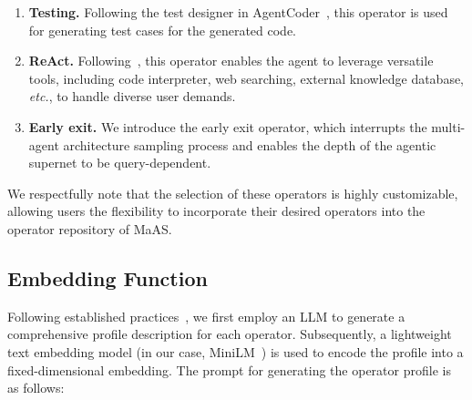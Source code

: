 \documentclass{article}
\theoremstyle{plain}
\theoremstyle{definition}
\theoremstyle{remark}
\newcommand{\ourmethod}{{{MaAS}}\xspace}
\begin{document}
\begin{enumerate}
    \item \textbf{Testing.} Following the test designer in AgentCoder~\cite{huang2023agentcoder}, this operator is used for generating test cases for the generated code.

    \item \textbf{ReAct.} Following~\citep{yao2023react}, this operator enables the agent to leverage versatile tools, including code interpreter, web searching, external knowledge database, \textit{etc.}, to handle diverse user demands. 

    \item \textbf{Early exit.} We introduce the early exit operator, which interrupts the multi-agent architecture sampling process and enables the depth of the agentic supernet to be query-dependent.

\end{enumerate}


We respectfully note that the selection of these operators is highly customizable, allowing users the flexibility to incorporate their desired operators into the operator repository of \ourmethod.

\subsection{Embedding Function}\label{app:embedding}

Following established practices~\cite{feng2024graphrouter}, we first employ an LLM to generate a comprehensive profile description for each operator. Subsequently, a lightweight text embedding model (in our case, MiniLM~\citep{wang2020minilm}) is used to encode the profile into a fixed-dimensional embedding. The prompt for generating the operator profile is as follows:
\end{document}
